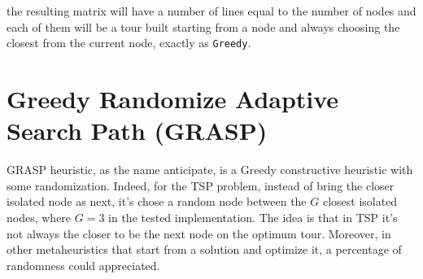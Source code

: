 the resulting matrix will have a number of lines equal to the number of nodes and each of them will be a tour built starting from a node and always choosing the closest from the current node, exactly as \texttt{Greedy}.

\section{Greedy Randomize Adaptive Search Path (GRASP)}\label{sec:grasp}
GRASP heuristic, as the name anticipate, is a Greedy constructive heuristic with some randomization. Indeed, for the TSP problem, instead of bring the closer isolated node as next, it's chose a random node between the $ G $ closest isolated nodes, where $ G = 3 $ in the tested implementation.
The idea is that in TSP it's not always the closer to be the next node on the optimum tour. Moreover, in other metaheuristics that start from a solution and optimize it, a percentage of randomness could appreciated.

